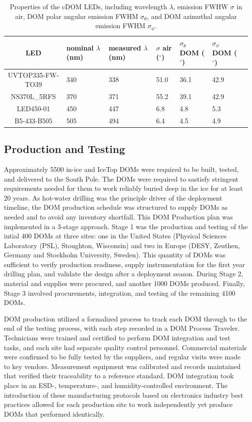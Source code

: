 \begin{table}
\caption{Properties of the cDOM LEDs, including wavelength $\lambda$,
  emission FWHW $\sigma$ in air, DOM polar
  angular emission FWHM $\sigma_{\theta}$, and DOM azimuthal angular emission
  FWHM $\sigma_{\phi}$.}
\begin{tabularx}{\linewidth}{|c|X|X|X|X|X|X|}
  \hline
 LED& nominal $\lambda$ (nm) & measured $\lambda$ (nm) & $\sigma$ air ($^{\circ}$) &
 $\sigma_{\theta}$ DOM ($^{\circ}$) & $\sigma_{\phi}$ DOM ($^{\circ}$)\\
\hline
UVTOP335-FW-TO39 & 340 & 338 & 51.0 & 36.1 & 42.9 \\
\hline
NS370L\_5RFS & 370 & 371 & 55.2 & 39.1 & 42.9 \\
\hline
LED450-01 & 450 & 447 &	6.8 & 4.8 &	5.3 \\
\hline
B5-433-B505 & 505 & 494 & 6.4 &	4.5 & 4.9 \\
\hline
\end{tabularx}
\label{table:cdom_properties}
\end{table}

\subsection{\label{sec:dom_prodtest} Production and Testing}

Approximately 5500 in-ice and IceTop DOMs were required to be built, tested,
and delivered to the South Pole.  The DOMs were required to sastisfy
stringent requirements needed for them to work reliably buried deep
in the ice for at least 20 years.  As hot-water drilling was the principle
driver of the deployment timeline, the DOM production schedule was
structured to supply DOMs as needed and to avoid any inventory shortfall.
This DOM Production plan was implemented in a 3-stage approach. Stage 1 was
the production and testing of the intial 400 DOMs at three sites: one in the United
States (Physical Sciences Laboratory (PSL), Stoughton, Wisconsin) and two
in Europe (DESY, Zeuthen, Germany and Stockholm University, Sweden).  This
quantity of DOMs was sufficient to verify production readiness, supply
instrumentation for the first year drilling plan, and validate the design after a deployment
season.  During Stage 2, material and supplies were procured, and another
1000 DOMs produced. Finally, Stage 3 involved procurements,
integration, and testing of the remaining 4100 DOMs.

DOM production utilized a formalized process to track each DOM through to
the end of the testing process, with each step recorded in a DOM Process
Traveler.  Technicians were trained and certified to perform DOM
integration and test tasks, and each site had separate quality control
personnel. Commercial materials were confirmed to be fully tested by the
suppliers, and regular visits were made to key vendors.  Measurement
equipment was calibrated and records maintained that verified their
traceability to a reference standard.  DOM integration took place in an
ESD-, temperature-, and humidity-controlled environment.  The introduction
of these manufacturing protocols based on electronics industry best
practices allowed for each production site to work independently yet
produce DOMs that performed identically.

